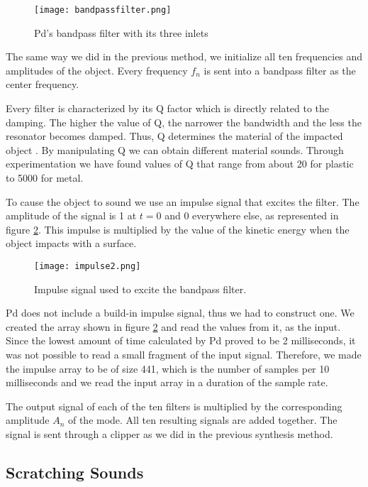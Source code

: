 \begin{figure}[H]
  \centering
    \texttt{[image: bandpassfilter.png]}
      \caption{Pd's bandpass filter with its three inlets}
      \label{fig:pdbandpass}
\end{figure} 

The same way we did in the previous method, we initialize all ten frequencies and amplitudes of the object. Every frequency $f_n$ is sent into a bandpass filter as the center frequency. 

Every filter is characterized by its Q factor which is directly related to the damping. The higher the value of Q, the narrower the bandwidth and the less the resonator becomes damped. Thus, Q determines the material of the impacted object \cite{gaver1993we}. By manipulating Q we can obtain different material sounds. Through experimentation we have found values of Q that range from about 20 for plastic to 5000 for metal. 

To cause the object to sound we use an impulse signal that excites the filter. The amplitude of the signal is 1 at $t=0$ and 0 everywhere else, as represented in figure \ref{fig:impulse}. This impulse is multiplied by the value of the kinetic energy when the object impacts with a surface. 

\begin{figure}[H]
  \centering
    \texttt{[image: impulse2.png]}
      \caption{Impulse signal used to excite the bandpass filter.}
      \label{fig:impulse}
\end{figure} 

Pd does not include a build-in impulse signal, thus we had to construct one. We created the array shown in figure \ref{fig:impulse} and read the values from it, as the input. Since the lowest amount of time calculated by Pd proved to be 2 milliseconds, it was not possible to read a small fragment of the input signal. Therefore, we made the impulse array to be of size 441, which is the number of samples per 10 milliseconds and we read the input array in a duration of the sample rate.

The output signal of each of the ten filters is multiplied by the corresponding amplitude $A_n$ of the mode. All ten resulting signals are added together. The signal is sent through a clipper as we did in the previous synthesis method.

\subsection{Scratching Sounds}\label{sec:scratching_synth}


